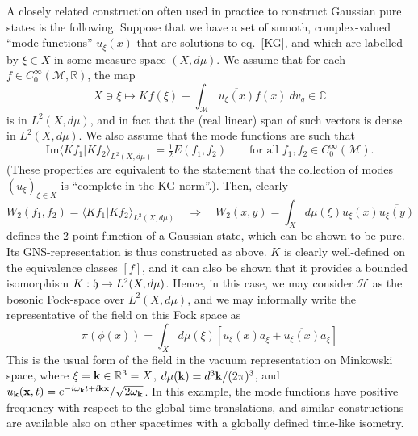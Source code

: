 \documentclass[12pt]{article}
\newcommand{\half}{\tfrac12}
\newcommand{\RR}{\mathbb{R}}
\newcommand{\CC}{\mathbb{C}}
\newcommand{\eH}{\mathscr{H}}
\renewcommand{\Im}{\mathrm{Im}}
\renewcommand{\half}{\tfrac{1}{2}}
\newcommand{\M}{\mathscr{M}}
\theoremstyle{plain}
\theoremstyle{definition}
\def\ben{\begin{equation}}
\def\een{\end{equation}}
\begin{document}
A closely related construction often used in practice to construct Gaussian pure states is the following.
Suppose that we have a set of smooth, complex-valued ``mode functions'' $u_\xi(x)$ that are
solutions to eq.~\eqref{KG}, and which are labelled by $\xi \in X$ in some
measure space $(X, d\mu)$. We assume that for each $f \in C^\infty_0(\M,\RR)$,
the map
\ben
X \owns \xi \mapsto Kf(\xi) \equiv \int_\M \overline{u_\xi(x)} f(x) \ dv_g \in \CC
\een
is in $L^2(X,d\mu)$, and in fact that the (real linear)
span of such vectors is dense in $L^2(X,d\mu)$. We also assume that the mode functions are such that
\ben\label{wronsk}
\Im \langle Kf_1 | Kf_2 \rangle_{L^2(X,d\mu)} = \half E(f_1, f_2) \qquad
\text{for all $f_1, f_2 \in C_0^\infty(\M)$.}
\een
(These properties are equivalent to the statement that the collection of modes
$(u_\xi)_{\xi \in X}$ is ``complete in the KG-norm''.). Then, clearly
\ben\label{modes}
W_2(f_1, f_2) = \langle Kf_1 | Kf_2 \rangle_{L^2(X,d\mu)} \quad
\Rightarrow \quad W_2(x,y) = \int_X d\mu(\xi)  u_\xi(x) \overline{u_\xi(y)}
\een
defines the 2-point function of a Gaussian state, which can be shown to be pure.
Its GNS-representation is thus constructed as above. $K$ is clearly well-defined on the equivalence classes $[f]$, and it can also be shown that
it provides a bounded isomorphism $K: {\frak h} \to L^2(X,d\mu)$. Hence, in this case,
we may consider $\eH$ as the bosonic Fock-space over $L^2(X,d\mu)$, and we may
informally write the representative of the field on this Fock space as
\ben
\pi(\phi(x)) = \int_X d\mu(\xi) [u_\xi(x) a_\xi^{} + \overline{u_\xi(x)} a_\xi^\dagger]
\een
This is the usual form of the field in the vacuum representation
on Minkowski space, where $\xi = {\bf k} \in \RR^3 = X$, $d\mu({\bf k}) = d^3 {\bf k} / (2\pi)^3$, and $u_{\bf k}({\bf x},t)
= 
e^{-i\omega_{\bf k} t + i{\bf kx}}/\sqrt{2\omega_{\bf k}}$. In this example, the mode functions have positive frequency
with respect to the global time translations, and similar constructions  are available also on other 
spacetimes with a globally defined time-like isometry. 
\end{document}
